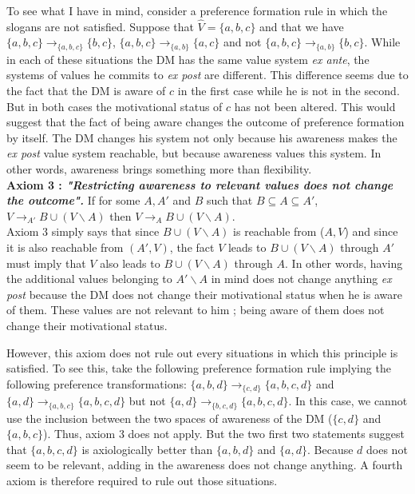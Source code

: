 \documentclass[11pt]{article}
\begin{document}
To see what I have in mind, consider a preference formation rule in which the slogans are not satisfied. Suppose that $\hat{V}= \{a,b,c\}$ and that we have $\{a,b,c\}\rightarrow_{\{a,b,c\}} \{b,c\}$,  $\{a,b,c\}\rightarrow_{\{a,b\}} \{a,c\}$ and not $\{a,b,c\}\rightarrow_{\{a,b\}} \{b,c\}$. While in each of these situations the DM has the same value system \textit{ex ante}, the systems of values he commits to \textit{ex post} are different. This difference seems due to the fact that the DM is aware of $c$ in the first case while he is not in the second. But in both cases the motivational status of $c$ has not been altered. This would suggest that the fact of being aware changes the outcome of preference formation by itself. The DM changes his system not only because his awareness makes the \textit{ex post} value system reachable, but because awareness values this system. In other words, awareness brings something more than flexibility. 
\\

\noindent
\textbf{Axiom 3 : \textit{"Restricting awareness to relevant values does not change the outcome".}} If for some $A,A'$ and $B$ such that $B\subseteq A \subseteq A'$,  $V\rightarrow_{A'} B\cup (V\backslash A)$ then $V \rightarrow_{A} B\cup (V\backslash A)$. 
\\





Axiom 3 simply says that since $B\cup (V\backslash A)$ is reachable from ($A,V$) and since it is also reachable from $(A',V)$, the fact $V$ leads to $B\cup (V\backslash A)$ through $A'$ must imply that $V$ also leads to $B\cup (V\backslash A)$ through $A$. In other words, having the additional values belonging to $A'\backslash A$ in mind does not change anything \textit{ex post} because the DM does not change their motivational status when he is aware of them. These values are not relevant to him ; being aware of them does not change their motivational status. 

However, this axiom does not rule out every situations in which this principle is satisfied. To see this, take the following preference formation rule implying the following preference transformations: $\{a,b,d\}\rightarrow_{\{c,d\}} \{a,b,c,d\}$ and  $\{a,d\}\rightarrow_{\{a,b,c\}} \{a,b,c,d\}$ but not $\{a,d\}\rightarrow_{\{b,c,d\}} \{a,b,c,d\}$. In this case, we cannot use the inclusion between the two spaces of awareness of the DM ($\{c,d\}$ and $\{a,b,c\}$). Thus, axiom 3 does not apply. But the two first two statements suggest that $\{a,b,c,d\}$ is axiologically better than  $\{a,b,d\}$ and $\{a,d\}$. Because $d$ does not seem to be relevant, adding in the awareness does not change anything. A fourth axiom is therefore required to rule out those situations. 
\\
\end{document}
